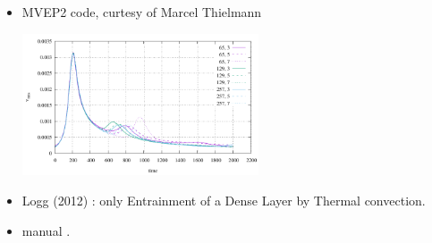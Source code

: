 \begin{itemize}
\item MVEP2 code, curtesy of Marcel Thielmann 

\begin{center}
\includegraphics[width=7cm]{images/benchmark_vaks97/MVEP2/vrms.pdf}
\end{center}





\item Logg \etal (2012) \cite{lomw12}: only Entrainment of a Dense Layer by Thermal convection.

\newpage
\item \aspect{} manual \cite{aspectmanual}.


\end{itemize}
